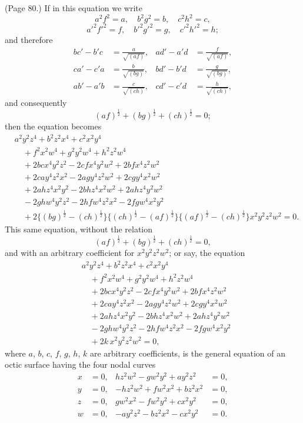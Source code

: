\documentclass[11pt,a4paper]{article}
\begin{document}
\noindent (Page 80.) If in this equation we write
\[
a^2 f^2 = a,\quad b^2 g^2 = b,\quad c^2 h^2 = c,
\]
\[
a'^2 f'^2 = f,\quad b'^2 g'^2 = g,\quad c'^2 h'^2 = h;
\]
and therefore
\begin{align*}
bc' - b'c &= \frac{a}{\sqrt{(af)}}, & ad' - a'd &= \frac{f}{\sqrt{(af)}}, \\
ca' - c'a &= \frac{b}{\sqrt{(bg)}}, & bd' - b'd &= \frac{g}{\sqrt{(bg)}}, \\
ab' - a'b &= \frac{c}{\sqrt{(ch)}}, & cd' - c'd &= \frac{h}{\sqrt{(ch)}},
\end{align*}
and consequently
\[
(af)^{\tfrac{1}{2}} + (bg)^{\tfrac{1}{2}} + (ch)^{\tfrac{1}{2}} = 0;
\]
then the equation becomes
\begin{align*}
&a^2 y^2 z^4 + b^2 z^2 x^4 + c^2 x^2 y^4 \\
&\quad + f^2 x^2 w^4 + g^2 y^2 w^4 + h^2 z^2 w^4 \\
&\quad + 2bc x^4 y^2 z^2 - 2cf x^4 y^2 w^2 + 2bf x^4 z^2 w^2 \\
&\quad + 2ca y^4 z^2 x^2 - 2ag y^4 z^2 w^2 + 2cg y^4 x^2 w^2 \\
&\quad + 2ah z^4 x^2 y^2 - 2bh z^4 x^2 w^2 + 2ah z^4 y^2 w^2 \\
&\quad - 2gh w^4 y^2 z^2 - 2hf w^4 z^2 x^2 - 2fg w^4 x^2 y^2 \\
&\quad + 2\{(bg)^{\tfrac{1}{2}} - (ch)^{\tfrac{1}{2}}\}\{(ch)^{\tfrac{1}{2}} - (af)^{\tfrac{1}{2}}\}\{(af)^{\tfrac{1}{2}} - (ch)^{\tfrac{1}{2}}\} x^2 y^2 z^2 w^2 = 0.
\end{align*}
This same equation, without the relation
\[
(af)^{\tfrac{1}{2}} + (bg)^{\tfrac{1}{2}} + (ch)^{\tfrac{1}{2}} = 0,
\]
and with an arbitrary coefficient for $x^2 y^2 z^2 w^2$; or say, the equation
\begin{align*}
&a^2 y^2 z^4 + b^2 z^2 x^4 + c^2 x^2 y^4 \\
&\quad + f^2 x^2 w^4 + g^2 y^2 w^4 + h^2 z^2 w^4 \\
&\quad + 2bc x^4 y^2 z^2 - 2cf x^4 y^2 w^2 + 2bf x^4 z^2 w^2 \\
&\quad + 2ca y^4 z^2 x^2 - 2ag y^4 z^2 w^2 + 2cg y^4 x^2 w^2 \\
&\quad + 2ah z^4 x^2 y^2 - 2bh z^4 x^2 w^2 + 2ah z^4 y^2 w^2 \\
&\quad - 2gh w^4 y^2 z^2 - 2hf w^4 z^2 x^2 - 2fg w^4 x^2 y^2 \\
&\quad + 2k\, x^2 y^2 z^2 w^2 = 0,
\end{align*}
where $a$, $b$, $c$, $f$, $g$, $h$, $k$ are arbitrary coefficients, is the general equation of an octic surface having the four nodal curves
\begin{align*}
x &= 0, & hz^2 w^2 - gw^2 y^2 + ay^2 z^2 &= 0, \\
y &= 0, & -hz^2 w^2 + fw^2 x^2 + bz^2 x^2 &= 0, \\
z &= 0, & gw^2 x^2 - fw^2 y^2 + cx^2 y^2 &= 0, \\
w &= 0, & -ay^2 z^2 - bz^2 x^2 - cx^2 y^2 &= 0.
\end{align*}
\end{document}
